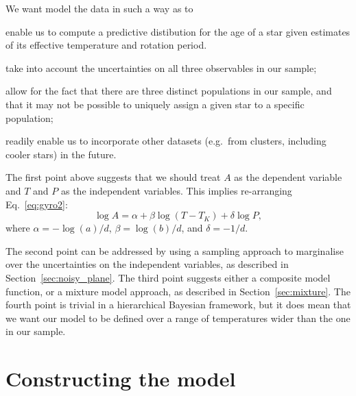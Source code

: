 \documentclass[11pt,a4paper]{article}
\newenvironment{packed_item}{
\begin{itemize}
\setlength{\itemsep}{1pt}
\setlength{\parskip}{0pt}
\setlength{\parsep}{0pt}
}{\end{itemize}}
\begin{document}
We want model the data in such a way as to 
\begin{packed_item}
\item enable us to compute a predictive distibution for the age of a
  star given estimates of its effective temperature and rotation
  period.
\item take into account the uncertainties on all three observables in
  our sample;
\item allow for the fact that there are three distinct populations in
  our sample, and that it may not be possible to uniquely assign a
  given star to a specific population;
\item readily enable us to incorporate other datasets (e.g.\ from
  clusters, including cooler stars) in the future.
\end{packed_item}

The first point above suggests that we should treat $A$ as the
dependent variable and $T$ and $P$ as the independent variables.  This
implies re-arranging Eq.~\ref{eq:gyro2}:
\begin{equation}
\log A = \alpha+ \beta \log \left(T-T_K \right) + \delta \log P,
\label{eq:gyro3}
\end{equation}
where $\alpha = - \log(a)/d$, $\beta = \log(b)/ d$, and $\delta=-1/d$.

The second point can be addressed by using a sampling approach to
marginalise over the uncertainties on the independent variables, as
described in Section~\ref{sec:noisy_plane}.  The third point suggests
either a composite model function, or a mixture model approach, as
described in Section~\ref{sec:mixture}. The fourth point is trivial in
a hierarchical Bayesian framework, but it does mean that we want our
model to be defined over a range of temperatures wider than the one in
our sample.

\section{Constructing the model}
\end{document}
